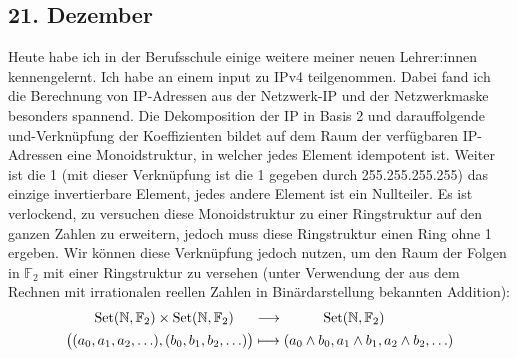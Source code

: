 \subsection{21. Dezember}
Heute habe ich in der Berufsschule einige weitere meiner neuen Lehrer:innen kennengelernt. Ich habe an einem input zu IPv4 teilgenommen. Dabei fand ich die Berechnung von IP-Adressen aus der Netzwerk-IP und der Netzwerkmaske besonders spannend. Die Dekomposition der IP in Basis 2 und darauffolgende und-Verknüpfung der Koeffizienten bildet auf dem Raum der verfügbaren IP-Adressen eine Monoidstruktur, in welcher jedes Element idempotent ist. Weiter ist die 1 (mit dieser Verknüpfung ist die 1 gegeben durch 255.255.255.255) das einzige invertierbare Element, jedes andere Element ist ein Nullteiler. Es ist verlockend, zu versuchen diese Monoidstruktur zu einer Ringstruktur auf den ganzen Zahlen zu erweitern, jedoch muss diese Ringstruktur einen Ring ohne 1 ergeben. Wir können diese Verknüpfung jedoch nutzen, um den Raum der Folgen in $\mathbb{F}_2$ mit einer Ringstruktur zu versehen (unter Verwendung der aus dem Rechnen mit irrationalen reellen Zahlen in Binärdarstellung bekannten Addition):
\begin{align*}
          \mathrm{Set}(\mathbb{N},\mathbb{F}_2)  \times \mathrm{Set}(\mathbb{N},\mathbb{F}_2) \hspace{.5cm}& \longrightarrow  \hspace{1cm}\mathrm{Set}(\mathbb{N},\mathbb{F}_2)  \\
        \big{(} (a_0, a_1, a_2, \hdots), (b_0, b_1, b_2, \hdots) \big{)} & \longmapsto  (a_0\wedge b_0, a_1\wedge b_1, a_2 \wedge b_2, \hdots)
\end{align*}
